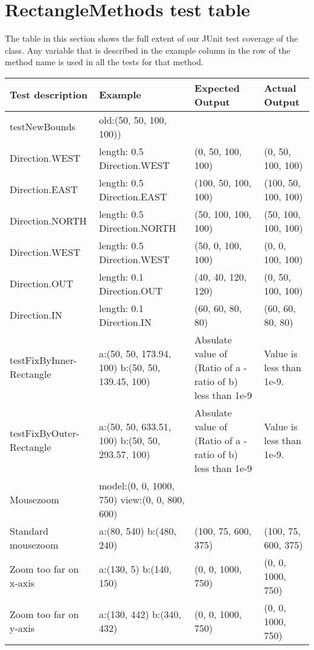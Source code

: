 \appendix
\appendixpage
\addappheadtotoc
\section{RectangleMethods test table}
\label{APP-JU-RM}
The table in this section shows the full extent of our JUnit test coverage of
the  class. Any variable that is described in the
example column in the row of the method name is used in all the tests for that
method.

\begin{centering}
\begin{tabular}{|p{3cm}|p{3cm}|p{3cm}|p{3cm}|}
\hline
Test description & Example & Expected Output & Actual Output\\
\hline
\hline
testNewBounds & old:(50, 50, 100, 100)) & &\\
\hline
Direction.WEST & length: 0.5 Direction.WEST & (0, 50,
100, 100) & (0, 50, 100, 100)\\
\hline
Direction.EAST & length: 0.5 Direction.EAST & (100, 50,
100, 100) & (100, 50, 100, 100)\\
\hline
Direction.NORTH & length: 0.5 Direction.NORTH & (50, 100,
100, 100) & (50, 100, 100, 100)\\
\hline
Direction.WEST & length: 0.5 Direction.WEST & (50, 0,
100, 100) & (0, 0, 100, 100)\\
\hline
Direction.OUT & length: 0.1 Direction.OUT & (40, 40,
120, 120) & (0, 50, 100, 100)\\
\hline
Direction.IN & length: 0.1 Direction.IN & (60, 60,
80, 80) & (60, 60, 80, 80)\\
\hline
\hline
testFixByInner-Rectangle & a:(50, 50, 173.94, 100) b:(50, 50,
139.45, 100) & Absulate value of (Ratio of a - ratio of b) less than 1e-9 &
Value is less than 1e-9.\\
\hline
\hline
testFixByOuter-Rectangle & a:(50, 50, 633.51, 100) b:(50, 50,
293.57, 100) & Absulate value of (Ratio of a - ratio of b) less than 1e-9 &
Value is less than 1e-9.\\
\hline
\hline
Mousezoom & model:(0, 0, 1000, 750) view:(0, 0, 800, 600) & & \\
\hline
Standard mousezoom & a:(80, 540) b:(480, 240) & (100, 75, 600, 375) & (100, 75,
600, 375)\\
\hline
Zoom too far on x-axis & a:(130, 5) b:(140, 150) & (0, 0, 1000, 750) & (0, 0,
1000, 750)\\
\hline
Zoom too far on y-axis & a:(130, 442) b:(340, 432) & (0, 0, 1000, 750) & (0, 0,
1000, 750)\\
\hline
\hline

\end{tabular}
\end{centering}